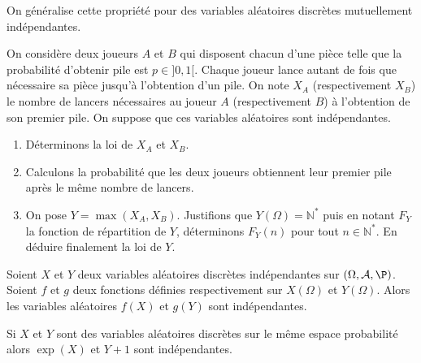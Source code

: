 \documentclass[french,11pt,twoside]{VcCours}
\begin{document}
\begin{Remarque}{} On généralise cette propriété pour des variables aléatoires discrètes mutuellement indépendantes.
\end{Remarque}

\begin{Exemple}{} On considère deux joueurs $A$ et $B$ qui disposent chacun d'une pièce telle que la probabilité d'obtenir pile est $p \in ]0,1[$. Chaque joueur lance autant de fois que nécessaire sa pièce jusqu'à l'obtention d'un pile. On note $X_A$ (respectivement $X_B$) le nombre de lancers nécessaires au joueur $A$ (respectivement $B$) à l'obtention de son premier pile. On suppose que ces variables aléatoires sont indépendantes. 
\begin{enumerate}
\item Déterminons la loi de $X_A$ et $X_B$. 

\vspace*{3cm}
\item Calculons la probabilité que les deux joueurs obtiennent leur premier pile après le même nombre de lancers.

\vspace*{6cm}


\item On pose $Y=\max (X_A,X_B)$. Justifions que $Y(\Omega) = \mathbb{N}^*$ puis en notant $F_Y$ la fonction de répartition de $Y$, déterminons $F_Y(n)$ pour tout $n \in \mathbb{N}^*$. En déduire finalement la loi de $Y$.

\vspace*{8cm}
\end{enumerate}
\end{Exemple}


\begin{Corollaire}{} Soient $X$ et $Y$ deux variables aléatoires discrètes indépendantes sur $(\Omega, \mathcal{A}, \P)$.  Soient $f$ et $g$ deux fonctions définies respectivement sur $X(\Omega)$ et $Y(\Omega)$. Alors les variables aléatoires $f(X)$ et $g(Y)$ sont indépendantes.
\end{Corollaire}

\begin{Demonstration}{}

\vspace*{4cm}
\end{Demonstration}

\begin{Exemple}{} Si $X$ et $Y$ sont des variables aléatoires discrètes sur le même espace probabilité alors $\exp(X)$ et $Y+1$ sont indépendantes.
\end{Exemple}
\end{document}
